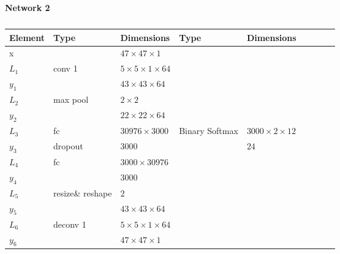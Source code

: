 \begin{table}[h!]
\centering
\caption*{{\bf \large Network 2}}
{\footnotesize
\begin{tabular}{|lllllllll|}
\hline
\multicolumn{1}{|l|}{Element} & Type     & \multicolumn{1}{l|}{Dimensions}                     & Type     & \multicolumn{1}{l|}{Dimensions}  \\ \hline
\multicolumn{1}{|l|}{x}       &          & \multicolumn{1}{l|}{$47\times47\times1$}            &          & \multicolumn{1}{l|}{}        \\ \hline
\multicolumn{1}{|l|}{$L_1$}   & conv 1   & \multicolumn{1}{l|}{$5\times 5\times1\times 64$}    &          & \multicolumn{1}{l|}{}\\
\multicolumn{1}{|l|}{$y_1$}   &          & \multicolumn{1}{l|}{$43\times43\times64$}           &          & \multicolumn{1}{l|}{}        \\ \hline
\multicolumn{1}{|l|}{$L_2$}   & max pool & \multicolumn{1}{l|}{$2\times 2$}                    &          & \multicolumn{1}{l|}{}        \\
\multicolumn{1}{|l|}{$y_2$}   &          & \multicolumn{1}{l|}{$22\times22\times 64$}          &          & \multicolumn{1}{l|}{}        \\ \hline
\multicolumn{1}{|l|}{$L_3$}   & fc       & \multicolumn{1}{l|}{$30976\times3000$}              & Binary Softmax & \multicolumn{1}{l|}{$3000\times2\times12$}        \\
\multicolumn{1}{|l|}{$y_3$}   & dropout  & \multicolumn{1}{l|}{$3000$}                         &          & \multicolumn{1}{l|}{$24$}        \\ \hline
\multicolumn{1}{|l|}{$L_4$}   & fc       & \multicolumn{1}{l|}{$3000\times30976$}              &          & \multicolumn{1}{l|}{}        \\
\multicolumn{1}{|l|}{$y_4$}   &          & \multicolumn{1}{l|}{$3000$}                         &          & \multicolumn{1}{l|}{}        \\ \hline
\multicolumn{1}{|l|}{$L_5$}   & resize\& reshape & \multicolumn{1}{l|}{$2$}                    &          & \multicolumn{1}{l|}{}        \\
\multicolumn{1}{|l|}{$y_5$}   &          & \multicolumn{1}{l|}{$43\times43\times 64$}          &          & \multicolumn{1}{l|}{}        \\ \hline
\multicolumn{1}{|l|}{$L_6$}   & deconv 1   & \multicolumn{1}{l|}{$5\times 5\times1\times 64$}    &          & \multicolumn{1}{l|}{}\\
\multicolumn{1}{|l|}{$y_6$}   &          & \multicolumn{1}{l|}{$47\times47\times1$}           &          & \multicolumn{1}{l|}{}        \\ \hline
\end{tabular}
\caption{} \label{net:2}
}
\end{table}

